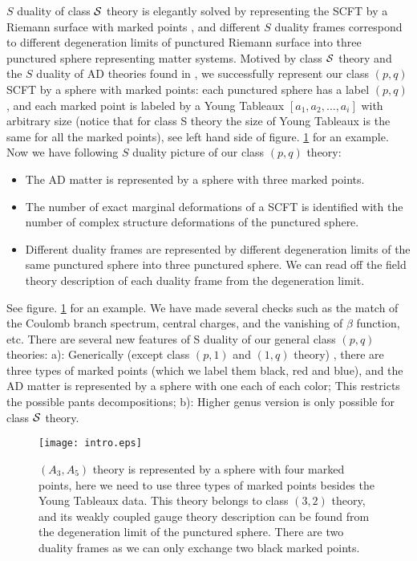 \documentclass[a4paper,11pt]{article}
\begin{document}
$S$ duality of class ${\cal S}$ theory is elegantly solved by representing the SCFT by a Riemann surface with marked points \cite{Gaiotto:2009we}, and different $S$ duality 
frames correspond to different degeneration limits of punctured Riemann surface into three punctured sphere representing matter systems. Motived by  class ${\cal S}$ theory and the $S$ duality  of
AD theories found in \cite{Xie:2016uqq}, we successfully represent our class $(p,q)$ SCFT by a sphere with marked points: each punctured sphere has a label $(p,q)$, and each marked point is labeled by
a Young Tableaux $[a_1,a_2,\ldots, a_i]$ with arbitrary size (notice that for class S theory the size of Young Tableaux is the same for all the marked points), see left hand side of figure. \ref{intro} for an example.
Now we have  following  $S$ duality picture of our class $(p,q)$ theory: 
\begin{itemize}
\item The AD matter is represented by a sphere with three marked points.
\item  The number of exact marginal deformations of a SCFT is identified with the number of complex structure deformations of 
the punctured sphere.
\item  Different duality frames are represented by different degeneration limits of the same punctured sphere into three punctured sphere.
We can read off the field theory description of each duality frame from the degeneration limit. 
\end{itemize}
See figure. \ref{intro} for an example. We have made several checks such as the match of the Coulomb branch spectrum, central charges, and the vanishing of $\beta$ function, etc. 
There are several new features of  S duality of our general class $(p,q)$  theories: a): Generically (except class $(p,1)$ and $(1,q)$ theory) , there are three types of marked points (which we label them black, red and blue), and the AD matter is represented by  a sphere with one each of each color; This restricts the possible pants decompositions; b): Higher genus version is only possible for class ${\cal S}$ theory. 

\begin{center}
\begin{figure}[htbp]
\small
\centering
\texttt{[image: intro.eps]}
\caption{$(A_3, A_5)$ theory is represented by a sphere with four  marked points, here we need to use three types of marked points besides the Young Tableaux data.
This theory belongs to  class $(3,2)$ theory, and its weakly coupled gauge theory description 
can be found from the degeneration limit of the punctured sphere. There are  two duality frames as we can only exchange two black marked points. }
\label{intro}
\end{figure}
\end{center}
\end{document}
